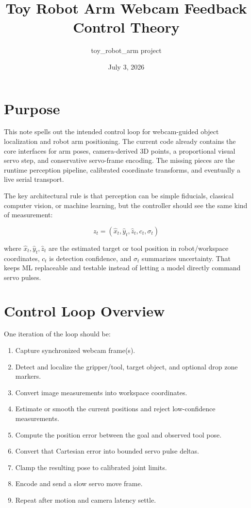 \documentclass[11pt]{article}
\title{Toy Robot Arm Webcam Feedback Control Theory}
\author{toy\_robot\_arm project}
\date{July 3, 2026}
\begin{document}
\maketitle

\section{Purpose}

This note spells out the intended control loop for webcam-guided object
localization and robot arm positioning. The current code already contains the
core interfaces for arm poses, camera-derived 3D points, a proportional visual
servo step, and conservative servo-frame encoding. The missing pieces are the
runtime perception pipeline, calibrated coordinate transforms, and eventually a
live serial transport.

The key architectural rule is that perception can be simple fiducials, classical
computer vision, or machine learning, but the controller should see the same
kind of measurement:

\[
    z_t = (\hat{x}_t, \hat{y}_t, \hat{z}_t, c_t, \sigma_t)
\]

where $\hat{x}_t,\hat{y}_t,\hat{z}_t$ are the estimated target or tool position
in robot/workspace coordinates, $c_t$ is detection confidence, and $\sigma_t$
summarizes uncertainty. That keeps ML replaceable and testable instead of
letting a model directly command servo pulses.

\section{Control Loop Overview}

One iteration of the loop should be:

\begin{enumerate}[leftmargin=*]
    \item Capture synchronized webcam frame(s).
    \item Detect and localize the gripper/tool, target object, and optional drop
          zone markers.
    \item Convert image measurements into workspace coordinates.
    \item Estimate or smooth the current positions and reject low-confidence
          measurements.
    \item Compute the position error between the goal and observed tool pose.
    \item Convert that Cartesian error into bounded servo pulse deltas.
    \item Clamp the resulting pose to calibrated joint limits.
    \item Encode and send a slow servo move frame.
    \item Repeat after motion and camera latency settle.
\end{enumerate}
\end{document}
